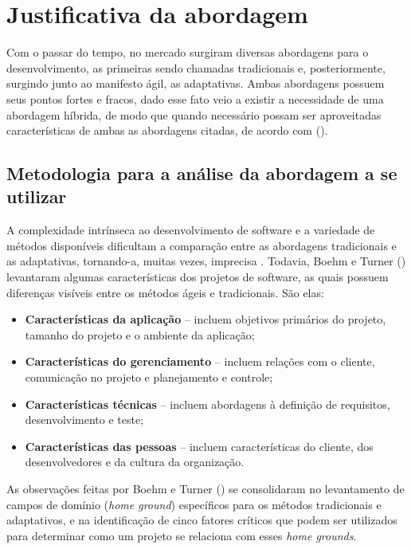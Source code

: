 \chapter[Justificativa da abordagem]{Justificativa da abordagem}
  
    Com o passar do tempo, no mercado surgiram diversas abordagens para o desenvolvimento,
   as primeiras sendo chamadas tradicionais e, posteriormente, surgindo junto ao manifesto ágil,
   as adaptativas. Ambas abordagens possuem seus pontos fortes e fracos, dado esse fato veio a existir a necessidade
   de uma abordagem híbrida, de modo que quando necessário possam ser aproveitadas características de ambas as abordagens
   citadas, de acordo com \citeauthor{boehm} (\citeyear{boehm}).
  
  \section{Metodologia para a análise da abordagem a se utilizar}
   
   A complexidade intrínseca ao desenvolvimento de software e a variedade de métodos disponíveis dificultam
   a comparação entre as abordagens tradicionais e as adaptativas, tornando-a, muitas vezes, imprecisa \cite{boehm}.
   Todavia, Boehm e Turner (\citeyear{boehm}) levantaram algumas características dos projetos de software, as quais possuem diferenças
   visíveis entre os métodos ágeis e tradicionais. São elas:
  
   \begin{itemize}
    \item \textbf{Características da aplicação} – incluem objetivos primários do projeto, tamanho do projeto e o ambiente da aplicação;
    \item \textbf{Características do gerenciamento} – incluem relações com o cliente, comunicação no projeto e planejamento e controle;
    \item \textbf{Características técnicas} – incluem abordagens à definição de requisitos, desenvolvimento e teste;
    \item \textbf{Características das pessoas} – incluem características do cliente, dos desenvolvedores e da cultura da organização.
   \end{itemize}   
   
   As observações feitas por Boehm e Turner (\citeyear{boehm}) se consolidaram no levantamento de campos de domínio (\textit{home ground}) específicos
   para os métodos tradicionais e adaptativos, e na identificação de cinco fatores críticos que podem ser utilizados para 
   determinar como um projeto se relaciona com esses \textit{home grounds}.
      

